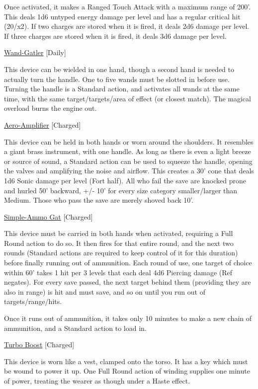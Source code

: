 \smallskip\noindent Once activated, it makes a Ranged Touch Attack with a maximum range of 200'. This deals 1d6 untyped energy damage per level and has a regular critical hit (20/x2). If two charges are stored when it is fired, it deals 2d6 damage per level. If three charges are stored when it is fired, it deals 3d6 damage per level. 

\medskip\noindent\underline{Wand-Gatler} [Daily] 

\noindent This device can be wielded in one hand, though a second hand is needed to actually turn the handle. One to five wands must be slotted in before use. Turning the handle is a Standard action, and activates all wands at the same time, with the same target/targets/area of effect (or closest match). The magical overload burns the engine out. 

\medskip\noindent\underline{Aero-Amplifier} [Charged]
 
\noindent This device can be held in both hands or worn around the shoulders. It resembles a giant brass instrument, with one handle. As long as there is even a light breeze or source of sound, a Standard action can be used to squeeze the handle, opening the valves and amplifying the noise and airflow. This creates a 30' cone that deals 1d6 Sonic damage per level (Fort half). All who fail the save are knocked prone and hurled 50' backward, +/- 10' for every size category smaller/larger than Medium. Those who pass the save are merely shoved back 10'. 

\medskip\noindent\underline{Simple-Ammo Gat} [Charged] 

\noindent This device must be carried in both hands when activated, requiring a Full Round action to do so. It then fires for that entire round, and the next two rounds (Standard actions are required to keep control of it for this duration) before finally running out of ammunition. Each round of use, one target of choice within 60' takes 1 hit per 3 levels that each deal 4d6 Piercing damage (Ref negates). For every save passed, the next target behind them (providing they are also in range) is hit and must save, and so on until you run out of targets/range/hits. 

\smallskip\noindent Once it runs out of ammunition, it takes only 10 minutes to make a new chain of ammunition, and a Standard action to load in. 

\medskip\noindent\underline{Turbo Boost} [Charged] 

\noindent This device is worn like a vest, clamped onto the torso. It has a key which must be wound to power it up. One Full Round action of winding supplies one minute of power, treating the wearer as though under a Haste effect. 

